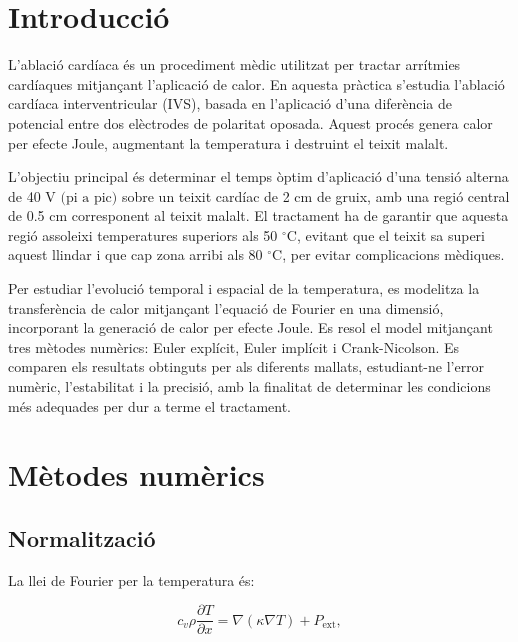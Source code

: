 \documentclass[a4paper,11pt,oneside]{article}
\begin{document}
\newpage

\tableofcontents

\newpage

\section{Introducció}

L'ablació cardíaca és un procediment mèdic utilitzat per tractar arrítmies cardíaques mitjançant l'aplicació de calor. En 
aquesta pràctica s'estudia l'ablació cardíaca interventricular (IVS), basada en l'aplicació d'una diferència de potencial entre 
dos elèctrodes de polaritat oposada. Aquest procés genera calor per efecte Joule, augmentant la temperatura i destruint el 
teixit malalt.

L'objectiu principal és determinar el temps òptim d'aplicació d'una tensió alterna de 40 V $\text{(pi a pic)}$ sobre un teixit 
cardíac de 2 cm de gruix, amb una regió central de 0.5 cm corresponent al teixit malalt. El tractament ha de garantir que aquesta 
regió assoleixi temperatures superiors als 50 $^\circ$C, evitant que el teixit sa superi aquest llindar i que cap zona arribi als 80 $^\circ$C, 
per evitar complicacions mèdiques.

Per estudiar l'evolució temporal i espacial de la temperatura, es modelitza la transferència de calor mitjançant l'equació de 
Fourier en una dimensió, incorporant la generació de calor per efecte Joule. Es resol el model mitjançant tres mètodes numèrics: 
Euler explícit, Euler implícit i Crank-Nicolson. Es comparen els resultats obtinguts per als diferents mallats, estudiant-ne 
l'error numèric, l'estabilitat i la precisió, amb la finalitat de determinar les condicions més adequades per dur a terme el 
tractament.

\section{Mètodes numèrics}

\subsection{Normalització}

La llei de Fourier per la temperatura és:

\begin{equation}
    c_v \rho \dfrac{\partial T}{\partial x} = \nabla (\kappa \nabla T) + P_{\text{ext}},
    \label{fourier}
\end{equation}
\end{document}
